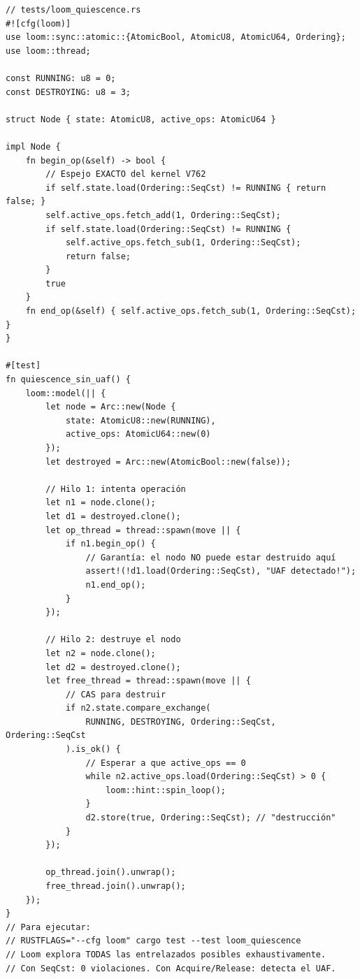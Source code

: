 \begin{verbatim}
// tests/loom_quiescence.rs
#![cfg(loom)]
use loom::sync::atomic::{AtomicBool, AtomicU8, AtomicU64, Ordering};
use loom::thread;

const RUNNING: u8 = 0;
const DESTROYING: u8 = 3;

struct Node { state: AtomicU8, active_ops: AtomicU64 }

impl Node {
    fn begin_op(&self) -> bool {
        // Espejo EXACTO del kernel V762
        if self.state.load(Ordering::SeqCst) != RUNNING { return false; }
        self.active_ops.fetch_add(1, Ordering::SeqCst);
        if self.state.load(Ordering::SeqCst) != RUNNING {
            self.active_ops.fetch_sub(1, Ordering::SeqCst);
            return false;
        }
        true
    }
    fn end_op(&self) { self.active_ops.fetch_sub(1, Ordering::SeqCst); }
}

#[test]
fn quiescence_sin_uaf() {
    loom::model(|| {
        let node = Arc::new(Node {
            state: AtomicU8::new(RUNNING),
            active_ops: AtomicU64::new(0)
        });
        let destroyed = Arc::new(AtomicBool::new(false));

        // Hilo 1: intenta operación
        let n1 = node.clone();
        let d1 = destroyed.clone();
        let op_thread = thread::spawn(move || {
            if n1.begin_op() {
                // Garantía: el nodo NO puede estar destruido aquí
                assert!(!d1.load(Ordering::SeqCst), "UAF detectado!");
                n1.end_op();
            }
        });

        // Hilo 2: destruye el nodo
        let n2 = node.clone();
        let d2 = destroyed.clone();
        let free_thread = thread::spawn(move || {
            // CAS para destruir
            if n2.state.compare_exchange(
                RUNNING, DESTROYING, Ordering::SeqCst, Ordering::SeqCst
            ).is_ok() {
                // Esperar a que active_ops == 0
                while n2.active_ops.load(Ordering::SeqCst) > 0 {
                    loom::hint::spin_loop();
                }
                d2.store(true, Ordering::SeqCst); // "destrucción"
            }
        });

        op_thread.join().unwrap();
        free_thread.join().unwrap();
    });
}
// Para ejecutar:
// RUSTFLAGS="--cfg loom" cargo test --test loom_quiescence
// Loom explora TODAS las entrelazados posibles exhaustivamente.
// Con SeqCst: 0 violaciones. Con Acquire/Release: detecta el UAF.
\end{verbatim}

